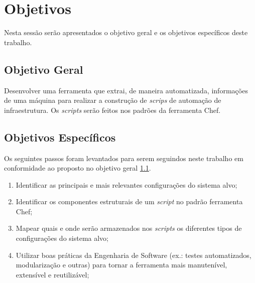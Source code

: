 \section{Objetivos}
\label{sec:obj}

Nesta sessão serão apresentados o objetivo geral e os objetivos específicos
deste trabalho.

\subsection{Objetivo Geral}
\label{sec:obj-grl}

Desenvolver uma ferramenta que extrai, de maneira automatizada, informações
de uma máquina para realizar a construção de \textit{scrips} de automação
de infraestrutura. Os \textit{scripts} serão feitos nos padrões da ferramenta
Chef.

\subsection{Objetivos Específicos}
\label{sec:obj-esp}

Os seguintes passos foram levantados para serem seguindos neste trabalho
em conformidade ao proposto no objetivo geral \ref{sec:obj-grl}.

\begin{enumerate}
  \item Identificar as principais e mais relevantes configurações do sistema
  alvo;
  \item Identificar os componentes estruturais de um \textit{script} no padrão 
  ferramenta Chef;
  \item Mapear quais e onde serão armazenados nos \textit{scripts} os
  diferentes tipos de configurações do sistema alvo;
  \item Utilizar boas práticas da Engenharia de Software (ex.: testes
  automatizados, modularização e outras) para tornar a ferramenta mais
  manutenível, extensível e reutilizável;
\end{enumerate}
